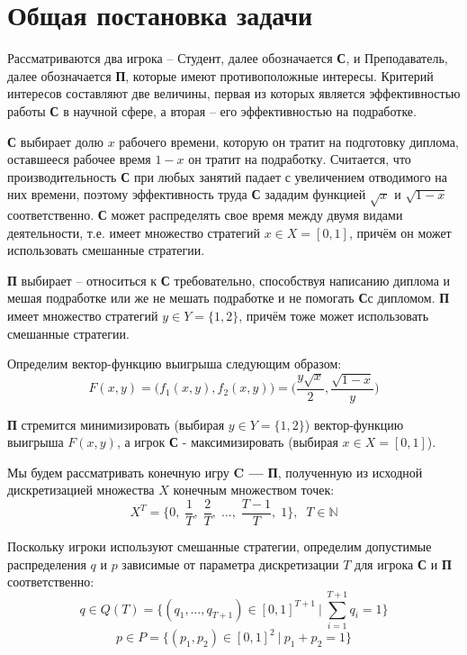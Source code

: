 \section{Общая постановка задачи}

Рассматриваются два игрока -- Студент, далее обозначается \textbf{С},
и Преподаватель, далее обозначается \textbf{П}, которые имеют противоположные 
интересы. Критерий интересов составляют две величины, первая из которых
является эффективностью работы \textbf{С} в научной сфере, а вторая -- его 
эффективностью на подработке.

\textbf{С} выбирает долю $x$ рабочего времени, которую он тратит на подготовку
диплома, оставшееся рабочее время $1-x$ он тратит на подработку. Считается, что 
производительность \textbf{С} при любых занятий падает с увеличением 
отводимого на них времени, поэтому эффективность труда \textbf{С} зададим 
функцией $\sqrt{x}$ и $\sqrt{1-x}$ соответственно. \textbf{С} может 
распределять свое время между двумя 
видами деятельности, т.е. имеет множество стратегий $x\in X = [0, 1]$, 
причём он может использовать смешанные стратегии.

\textbf{П} выбирает -- относиться к \textbf{С} требовательно, способствуя 
написанию диплома и мешая подработке или же не мешать подработке и не помогать
\textbf{С}с дипломом. \textbf{П} имеет множество стратегий 
$y \in Y=\{1, 2\}$, причём тоже может использовать смешанные стратегии.

Определим вектор-функцию выигрыша следующим образом:
\begin{equation}
	F(x, y)=
	\big(f_1(x,y), f_2(x,y)\big) =
	\Big(
		\frac{y\sqrt{x}}2,
		\frac{\sqrt{1-x}}y
	\Big)
	\label{eq:player_criterion}
\end{equation}

\textbf{П} стремится минимизировать (выбирая $y \in Y = \{1,2\}$)
вектор-функцию выигрыша $F(x, y)$, а игрок \textbf{С} - максимизировать
 (выбирая $x \in X=[0,1]$).

Мы будем рассматривать конечную игру \textbf{C --- П}, полученную из исходной дискретизацией множества $X$ конечным множеством точек:
$$
	X^T = \{
		0, \; 
		\frac{1}{T}, \; 
		\frac{2}{T}, \; 
		\ldots, \; 
		\frac{T-1}{T}, \;
		1
	\}, \;\; T \in \mathbb{N}
$$

Поскольку игроки используют смешанные стратегии, определим допустимые
распределения $q$ и $p$ зависимые от параметра дискретизации $T$ для игрока
 \textbf{С} и \textbf{П} соответственно:
\begin{equation}
	\label{eq:P_T}
	q \in Q(T)
	= \{ 
		(q_1, \ldots , q_{T+1}) \in [0,1]^{T+1}\: | \:
		\sum \limits_{i=1}^{T+1} q_i = 1
	\}
\end{equation}
\begin{equation}
	\label{eq:Q}
	p \in P
	= \{ 
		(p_1, p_2) \in [0,1]^2\: | \:
		p_1 + p_2 = 1
	\}
\end{equation}

